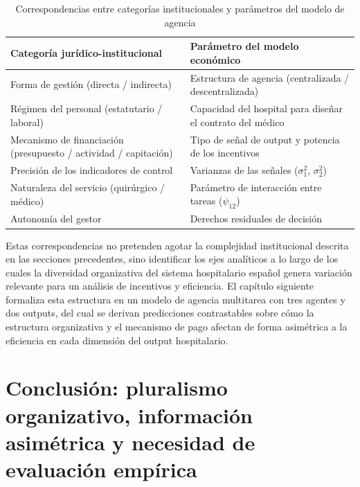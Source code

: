 \begin{table}[htbp]
\centering
\caption{Correspondencias entre categorías institucionales y parámetros del modelo de agencia}
\label{tab:correspondencias}
\begin{tabular}{p{5.5cm}p{5.5cm}}
\toprule
\textbf{Categoría jurídico-institucional} & \textbf{Parámetro del modelo económico} \\
\midrule
Forma de gestión (directa / indirecta) & Estructura de agencia (centralizada / descentralizada) \\[3pt]
Régimen del personal (estatutario / laboral) & Capacidad del hospital para diseñar el contrato del médico \\[3pt]
Mecanismo de financiación (presupuesto / actividad / capitación) & Tipo de señal de output y potencia de los incentivos \\[3pt]
Precisión de los indicadores de control & Varianzas de las señales ($\sigma_1^2$, $\sigma_2^2$) \\[3pt]
Naturaleza del servicio (quirúrgico / médico) & Parámetro de interacción entre tareas ($\psi_{12}$) \\[3pt]
Autonomía del gestor & Derechos residuales de decisión \\
\bottomrule
\end{tabular}
\end{table}

Estas correspondencias no pretenden agotar la complejidad institucional descrita en las secciones precedentes, sino identificar los ejes analíticos a lo largo de los cuales la diversidad organizativa del sistema hospitalario español genera variación relevante para un análisis de incentivos y eficiencia. El capítulo siguiente formaliza esta estructura en un modelo de agencia multitarea con tres agentes y dos outputs, del cual se derivan predicciones contrastables sobre cómo la estructura organizativa y el mecanismo de pago afectan de forma asimétrica a la eficiencia en cada dimensión del output hospitalario.



\section{Conclusión: pluralismo organizativo, información asimétrica y necesidad de evaluación empírica}

